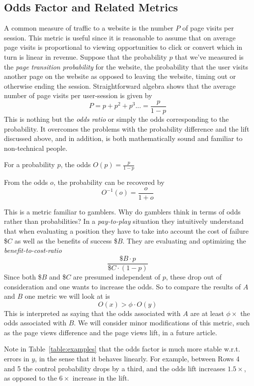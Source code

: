 \documentclass[letterpaper,12pt]{article}
\newcommand{\beq}{\begin{equation}} %
\newcommand{\eeq}{\end{equation}} %
\newcommand{\bdm}{\begin{displaymath}} %
\newcommand{\edm}{\end{displaymath}} %
\begin{document}
\subsection{Odds Factor and Related Metrics}
\label{sec:metric_odds_factor}
A common measure of traffic to a website is the number \(P\) of page
visits per session. This metric is useful since it is reasonable to
assume that on average page visits is proportional to viewing
opportunities to click or convert which in turn is linear in revenue.
Suppose that the probability \(p\) that we've measured is the {\em
  page transition probability} for the website, the probability that
the user visits another page on the website as opposed to leaving the
website, timing out or otherwise ending the session. Straightforward
algebra shows that the average number of page visits per user-session
is given by
\beq
P = p+ p^2 + p^3 ... = \frac{p}{1-p}
\eeq
This is nothing but the {\em odds ratio} or simply the odds
corresponding to the probability. It overcomes the problems with the
probability difference and the lift discussed above, and in addition,
is both mathematically sound and familiar to non-technical people.
\begin{definition}
\label{def:odds}
For a probability \(p\), the odds \(O(p) = \frac{p}{1-p}\)
\end{definition}

From the odds \(o\), the probability can be recovered by
\beq
\label{eq:podds}
O^{-1}(o) = \frac{o}{1+o}
\eeq

This is a metric familiar to gamblers. Why do gamblers think in terms
of odds rather than probabilities? In a {\em pay-to-play} situation
they intuitively understand that when evaluating a position they have
to take into account the cost of failure \$\(C\) as well as the
benefits of success \$\(B\). They are evaluating and optimizing the
{\it benefit-to-cost-ratio}
\bdm
\frac{\$B \cdot p}{\$C \cdot (1-p)}
\edm
Since both \$\(B\) and \$\(C\) are presumed independent of \(p\), these
drop out of consideration and one wants to increase the odds.  So to
compare the results of \(A\) and \(B\) one metric we will look
at is
\beq
\label{eq:oddsfactor}
O(x) > \phi\cdot O(y)
\eeq
This is interpreted as saying that the odds associated with \(A\) are
at least \(\phi \times\) the odds associated with \(B\). We will
consider minor modifications of this metric, such as the page views
difference and the page views lift, in a future article.

Note in Table~\ref{table:examples} that the odds factor is much more
stable w.r.t. errors in \(y\), in the sense that it behaves
linearly. For example, between Rows 4 and 5 the control probability
drops by a third, and the odds lift increases \(1.5\times\), as
opposed to the \(6\times\) increase in the lift.
\end{document}
